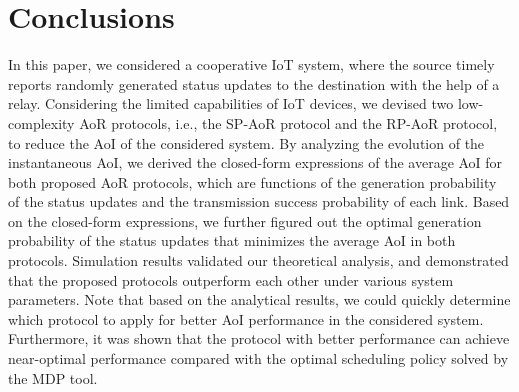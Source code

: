 \documentclass{IEEEtran}
\begin{document}
\section{Conclusions}
In this paper, we considered a cooperative IoT system, where the source timely reports randomly generated status updates to the destination with the help of a relay. 
Considering the limited capabilities of IoT devices,
we devised two low-complexity AoR protocols, i.e., the SP-AoR protocol and the RP-AoR protocol, to reduce the AoI of the considered system. By analyzing the evolution of the instantaneous AoI, we derived the closed-form expressions of the average AoI for both proposed AoR protocols, which are functions of the generation probability of the status updates and the transmission success probability of each link. Based on the closed-form expressions, we further figured out the optimal generation probability of the status updates that minimizes the average AoI in both protocols. Simulation results validated our theoretical analysis, and demonstrated that the proposed protocols outperform each other under various system parameters. Note that based on the analytical results, we could quickly determine which protocol to apply for better AoI performance in the considered system. Furthermore, it was shown that the protocol with better performance can achieve near-optimal performance compared with the optimal scheduling policy solved by the MDP tool.






\end{document}
